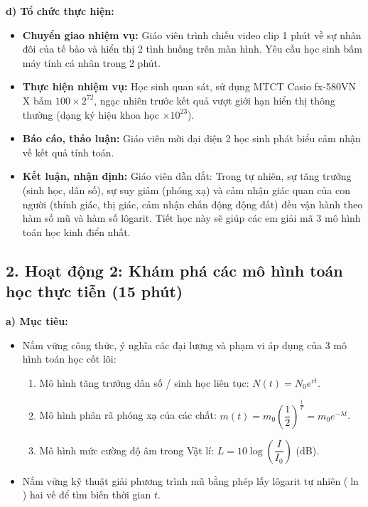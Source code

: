 \documentclass[12pt, a4paper]{article}
\begin{document}
\noindent \textbf{d) Tổ chức thực hiện:}
\begin{itemize}[leftmargin=0.6cm]
    \item \textbf{Chuyển giao nhiệm vụ:} Giáo viên trình chiếu video clip 1 phút về sự nhân đôi của tế bào và hiển thị 2 tình huống trên màn hình. Yêu cầu học sinh bấm máy tính cá nhân trong 2 phút.
    \item \textbf{Thực hiện nhiệm vụ:} Học sinh quan sát, sử dụng MTCT Casio fx-580VN X bấm $100 \times 2^{72}$, ngạc nhiên trước kết quả vượt giới hạn hiển thị thông thường (dạng ký hiệu khoa học $\times 10^{23}$).
    \item \textbf{Báo cáo, thảo luận:} Giáo viên mời đại diện 2 học sinh phát biểu cảm nhận về kết quả tính toán.
    \item \textbf{Kết luận, nhận định:} Giáo viên dẫn dắt: Trong tự nhiên, sự tăng trưởng (sinh học, dân số), sự suy giảm (phóng xạ) và cảm nhận giác quan của con người (thính giác, thị giác, cảm nhận chấn động động đất) đều vận hành theo hàm số mũ và hàm số lôgarit. Tiết học này sẽ giúp các em giải mã 3 mô hình toán học kinh điển nhất.
\end{itemize}

\vspace{5pt}

\subsection*{2. Hoạt động 2: Khám phá các mô hình toán học thực tiễn (15 phút)}

\noindent \textbf{a) Mục tiêu:}
\begin{itemize}[leftmargin=0.6cm]
    \item Nắm vững công thức, ý nghĩa các đại lượng và phạm vi áp dụng của 3 mô hình toán học cốt lõi:
    \begin{enumerate}
        \item Mô hình tăng trưởng dân số / sinh học liên tục: $N(t) = N_0 e^{rt}$.
        \item Mô hình phân rã phóng xạ của các chất: $m(t) = m_0 \left(\dfrac{1}{2}\right)^{\frac{t}{T}} = m_0 e^{-\lambda t}$.
        \item Mô hình mức cường độ âm trong Vật lí: $L = 10 \log\left(\dfrac{I}{I_0}\right)$ (dB).
    \end{enumerate}
    \item Nắm vững kỹ thuật giải phương trình mũ bằng phép lấy lôgarit tự nhiên ($\ln$) hai vế để tìm biến thời gian $t$.
\end{itemize}
\end{document}
